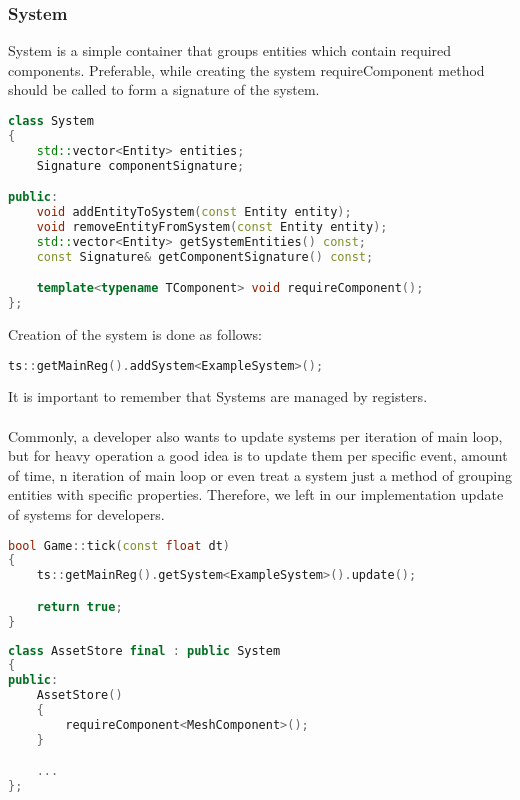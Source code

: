 \subsubsection{System}
System is a simple container that groups entities which contain required components. Preferable, while creating the system requireComponent method should be called to form a signature of the system.
\begin{lstlisting}[language=c++, caption=System class (./engine/include/tsengine/ecs/ecs.h)]
class System
{
    std::vector<Entity> entities;
    Signature componentSignature;

public:
    void addEntityToSystem(const Entity entity);
    void removeEntityFromSystem(const Entity entity);
    std::vector<Entity> getSystemEntities() const;
    const Signature& getComponentSignature() const;

    template<typename TComponent> void requireComponent();
};
\end{lstlisting}

Creation of the system is done as follows:
\begin{lstlisting}[language=c++, caption=Creation of the system (./game/game.cpp)]
    ts::getMainReg().addSystem<ExampleSystem>();
\end{lstlisting}
It is important to remember that Systems are managed by registers.
\\
\\
Commonly, a developer also wants to update systems per iteration of main loop, but for heavy operation a good idea is to update them per specific event, amount of time, n iteration of main loop or even treat a system just a method of grouping entities with specific properties. Therefore, we left in our implementation update of systems for developers.

\begin{lstlisting}[language=c++, caption=Update of systems every iteration of the main loop(./game/game.cpp)]
bool Game::tick(const float dt)
{
    ts::getMainReg().getSystem<ExampleSystem>().update();

    return true;
}
\end{lstlisting}

\begin{lstlisting}[language=c++, caption=System as a method of grouping entities (./game/game.cpp)]
class AssetStore final : public System
{
public:
    AssetStore()
    {
        requireComponent<MeshComponent>();
    }

    ...
};
\end{lstlisting}

